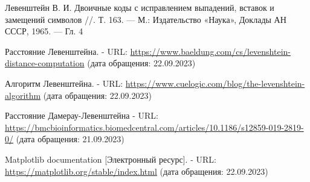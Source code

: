 
\renewcommand\bibname{Список использованной литературы}
\begin{thebibliography}{}
\bibitem {} Левенштейн В. И. Двоичные коды с исправлением выпадений, вставок
и замещений символов //. Т. 163. — М.: Издательство «Наука», Доклады
АН СССР, 1965. — Гл. 4

 Расстояние Левенштейна. - URL: \url{https://www.baeldung.com/cs/levenshtein-distance-computation} (дата обращения: 22.09.2023)

 Алгоритм Левенштейна. - URL: \url{https://www.cuelogic.com/blog/the-levenshtein-algorithm} (дата обращения: 22.09.2023)

 Расстояние Дамерау-Левенштейна - URL: \url{https://bmcbioinformatics.biomedcentral.com/articles/10.1186/s12859-019-2819-0/} (дата обращения: 21.09.2023)

 Matplotlib documentation [Электронный ресурс]. - URL: \url{https://matplotlib.org/stable/index.html} (дата обращения: 22.09.2023)

\end{thebibliography}